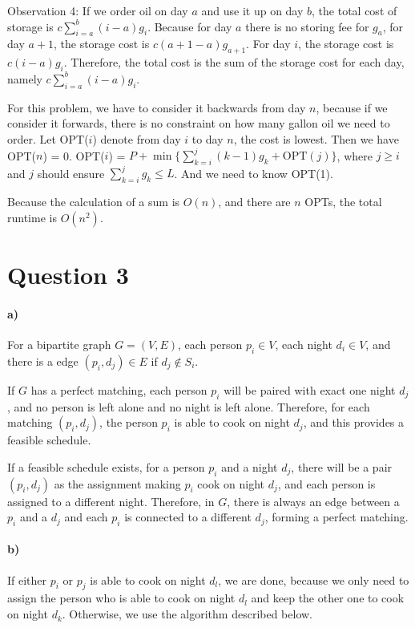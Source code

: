 \documentclass[letter,12pt]{article}
\begin{document}
Observation 4: If we order oil on day $a$ and use it up on day $b$, the total
cost of storage is $c\sum\limits_{i=a}^b (i-a)g_i$. Because for day $a$ there is
no storing fee for $g_a$, for day $a+1$, the storage cost is $c(a+1-a)g_{a+1}$.
For day $i$, the storage cost is $c(i-a)g_i$. Therefore, the total cost is the sum
of the storage cost for each day, namely $c\sum\limits_{i=a}^b (i-a)g_i$.

For this problem, we have to consider it backwards from day $n$, because if we
consider it forwards, there is no constraint on how many gallon oil we need to 
order. Let OPT($i$) denote from day $i$ to day $n$, the cost is lowest. Then we
have OPT($n$) = 0. OPT($i$) = $P+ \min\{ \sum\limits_{k=i}^{j} (k-1)g_k + 
\text{OPT}(j)\}$, where $j \ge i$ and $j$ should ensure $\sum\limits_{k=i}^j g_k 
\le L$. And we need to know OPT(1).

Because the calculation of a sum is $O(n)$, and there are $n$ OPTs, the total
runtime is $O(n^2)$.

\section*{Question 3}
\paragraph*{a)}
For a bipartite graph $G=(V,E)$, each person $p_i \in V$, each night $d_i \in 
 V$, and there is a edge $(p_i, d_j) \in E$ if $d_j \notin S_i$.
 
 If $G$ has a perfect matching, each person $p_i$ will be paired with exact one 
 night $d_j$, and no person is left alone and no night is left alone. Therefore, 
 for each matching $(p_i, d_j)$, the person $p_i$ is able to cook on night $d_j$,
 and this provides a feasible schedule.
 
 If a feasible schedule exists, for a person $p_i$ and a night $d_j$, there 
 will be a pair $(p_i, d_j)$ as the assignment making $p_i$ cook on night $d_j$,
 and each person is assigned to a different night.  Therefore, in $G$, there is 
 always an edge between a $p_i$ and a $d_j$ and each $p_i$ is connected to a 
 different $d_j$, forming a perfect matching.
 \paragraph*{b)}
If either $p_i$ or $p_j$ is able to cook on night $d_l$, we are done, because
we only need to assign the person who is able to cook on night $d_l$ and keep
the other one to cook on night $d_k$. Otherwise, we use the algorithm described
below. 
 
\end{document}
